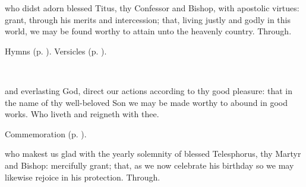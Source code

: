 

\memorialCollect\label{TitusCollect}
 who didst adorn blessed Titus, thy Confessor and Bishop, with apostolic virtues: grant, through his merits and intercession; that, living justly and godly in this world, we may be found worthy to attain unto the heavenly country. Through.




\begin{rubric}
	Hymns  (p. \pageref{Christmas}). Versicles  (p. \pageref{Circumcision}).
\end{rubric}

\\



\collect
{} and everlasting God, direct our actions according to thy good pleasure: that in the name of thy well-beloved Son we may be made worthy to abound in good works. Who liveth and reigneth with thee.

\begin{rubric}
	Commemoration  (p. \pageref{TelesphorusCollect}).
\end{rubric}




\memorialCollect\label{TelesphorusCollect}
 who makest us glad with the yearly solemnity of blessed Telesphorus, thy Martyr and Bishop: mercifully grant; that, as we now celebrate his birthday so we may likewise rejoice in his protection. Through.




